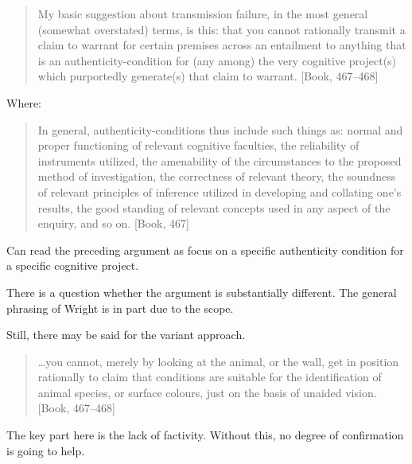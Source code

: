\documentclass[10pt]{article}
\newcommand{\hozline}[0]{%
  \noindent\hdashrule[0.5ex][c]{\textwidth}{.1pt}{}
}
\begin{document}
\begin{note}
  \begin{quote}
    My basic suggestion about transmission failure, in the most general (somewhat overstated) terms, is this: that you cannot rationally transmit a claim to warrant for certain premises across an entailment to anything that is an authenticity-condition for (any among) the very cognitive project(s) which purportedly generate(s) that claim to warrant.
    [Book, 467--468]
  \end{quote}
Where:
  \begin{quote}
    In general, authenticity-conditions thus include such things as: normal and proper functioning of relevant cognitive faculties, the reliability of instruments utilized, the amenability of the circumstances to the proposed method of investigation, the correctness of relevant theory, the soundness of relevant principles of inference utilized in developing and collating one’s results, the good standing of relevant concepts used in any aspect of the enquiry, and so on.
    [Book, 467]
  \end{quote}

  Can read the preceding argument as focus on a specific authenticity condition for a specific cognitive project.

  There is a question whether the argument is substantially different.
  The general phrasing of Wright is in part due to the scope.

  Still, there may be said for the variant approach.
  

\begin{quote}
  \dots you cannot, merely by looking at the animal, or the wall, get in position rationally to claim that conditions are suitable for the identiﬁcation of animal species, or surface colours, just on the basis of unaided vision.
    [Book, 467--468]
  \end{quote}
  
\end{note}

\begin{note}
  The key part here is the lack of factivity.
  Without this, no degree of confirmation is going to help.
\end{note}

\hozline
\end{document}
